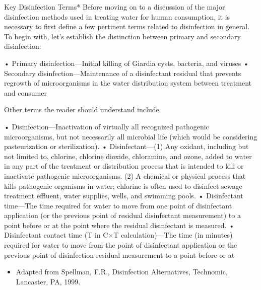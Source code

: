 \documentclass{article}
\begin{document}
Key Disinfection Terms* Before moving on to a discussion of the major
disinfection methods used in treating water for human consumption, it is
necessary to first define a few pertinent terms related to disinfection
in general. To begin with, let's establish the distinction between
primary and secondary disinfection:

• Primary disinfection---Initial killing of Giardia cysts, bacteria, and
viruses • Secondary disinfection---Maintenance of a disinfectant
residual that prevents regrowth of microorganisms in the water
distribution system between treatment and consumer

Other terms the reader should understand include

• Disinfection---Inactivation of virtually all recognized pathogenic
microorganisms, but not necessarily all microbial life (which would be
considering pasteurization or sterilization). • Disinfectant---(1) Any
oxidant, including but not limited to, chlorine, chlorine dioxide,
chloramine, and ozone, added to water in any part of the treatment or
distribution process that is intended to kill or inactivate pathogenic
microorganisms. (2) A chemical or physical process that kills pathogenic
organisms in water; chlorine is often used to disinfect sewage treatment
effluent, water supplies, wells, and swimming pools. • Disinfectant
time---The time required for water to move from one point of
disinfectant application (or the previous point of residual disinfectant
measurement) to a point before or at the point where the residual
disinfectant is measured. • Disinfectant contact time (T in C×T
calculation)---The time (in minutes) required for water to move from the
point of disinfectant application or the previous point of disinfection
residual measurement to a point before or at

\begin{itemize}
\tightlist
\item
  Adapted from Spellman, F.R., Disinfection Alternatives, Technomic,
  Lancaster, PA, 1999.
\end{itemize}
\end{document}
